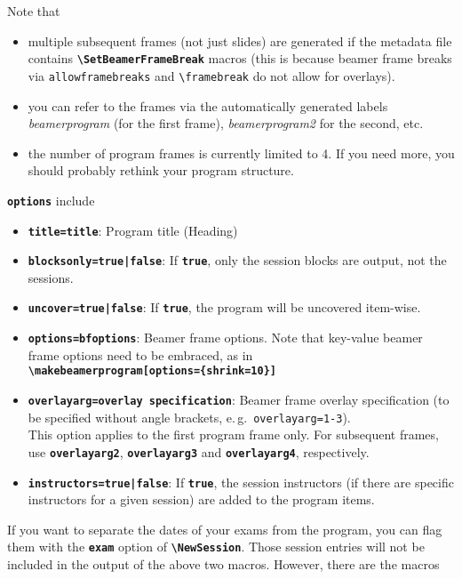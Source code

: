 \documentclass[english]{article}
\newcommand*\jmacro[1]{\textbf{\texttt{#1}}}
\newcommand*\jcsmacro[1]{\jmacro{\textbackslash{#1}}}
\newcommand*\joption[1]{\textbf{\texttt{#1}}}
\newcommand*\jfoption[1]{\texttt{#1}}
\newcommand*\jfmacro[1]{\texttt{#1}}
\newcommand*\jfcsmacro[1]{\jfmacro{\textbackslash{#1}}}
\newcommand*\jparam[1]{\angus #1\angud}
\begin{document}
\begin{itemize}
Note that 
\begin{itemize}
	\item multiple subsequent frames (not just slides) are generated if the metadata
	      file contains \jcsmacro{SetBeamerFrameBreak} macros (this is because beamer frame breaks
	      via \jfoption{allowframebreaks} and \jfcsmacro{framebreak} do not allow for overlays).
	\item you can refer to the frames via the automatically generated
	      labels \emph{beamerprogram} (for the first frame), \emph{beamerprogram2}
	       for the second, etc. 
	\item the number of program frames is currently limited to 4. If you need more, you should probably rethink
	      your program structure.
\end{itemize}
%
\joption{\jparam{options}} include
\begin{itemize}
\item \joption{title=\jparam{title}}: Program title (\jparam{Heading})
\item \joption{blocksonly=\jparam{true|false}}: If \joption{true}, only the session blocks are output,
      not the sessions.
\item \joption{uncover=\jparam{true|false}}: If \joption{true}, the program will be uncovered item-wise.
\item \joption{options=\jparam{bfoptions}}: Beamer frame options. Note that key-value
    beamer frame options need to be embraced, as in\\
    \jcsmacro{makebeamerprogram[options=\{shrink=10\}]}
\item \joption{overlayarg=\jparam{overlay specification}}: Beamer frame overlay specification
     (to be specified without angle brackets, e.\,g.\ \jfoption{overlayarg=1-3}).\\
     This option applies to the first program frame only. For subsequent frames,
     use \joption{overlayarg2}, \joption{overlayarg3} and \joption{overlayarg4},
     respectively.
\item \joption{instructors=\jparam{true|false}}: If \joption{true}, the session instructors
    (if there are specific instructors for a given session) are added to the program items.
\end{itemize}

\end{itemize}
%
If you want to separate the dates of your exams from the program, you can flag them with
the \joption{exam} option of \jcsmacro{NewSession}. Those session entries will not be included
in the output of the above two macros. However, there are the macros
\end{document}
